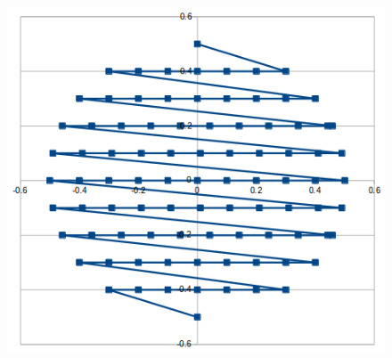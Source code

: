 \begin{center}
\begin{figure}[H]
\centering
\includegraphics[width=12cm]{./spheroid2dpath.png}
\end{figure}
\end{center}
